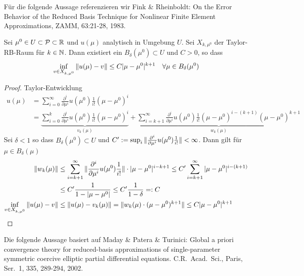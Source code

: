 Für die folgende Aussage referenzieren wir Fink \& Rheinboldt: On the Error Behavior of the Reduced Basis Technique for Nonlinear Finite Element Approximations, ZAMM, 63:21-28, 1983.

\begin{satz}
	Sei $\mu^0 \in U \subset \mathcal{P} \subset \mathbb{R}$ und $u(\mu)$ analytisch in Umgebung $U$. Sei $X_{k,\mu^0}$ der Taylor-RB-Raum für $k \in \mathbb{N}$. Dann existiert ein $B_\delta(\mu^0) \subset U$ und $C > 0$, so dass
	\[
		\inf_{v \in X_{k,\mu^0}} \|u(\mu)-v\| \leq C |\mu-\mu^0|^{k+1} \quad \forall \mu \in B_\delta(\mu^0)
	\]

	\begin{proof}
		Taylor-Entwicklung
		\begin{align*}
			u(\mu) &= \sum_{i=0}^\infty \frac{\partial^i}{\partial\mu^i} u(\mu^0) \frac{1}{i!} (\mu-\mu^0)^i\\
			&= \underbrace{\sum_{i=0}^k \frac{\partial^i}{\partial\mu^i} u(\mu^0) \frac{1}{i!} (\mu-\mu^0)^i}_{v_k(\mu)} + \underbrace{\sum_{i=k+1}^\infty \frac{\partial^i}{\partial\mu^i} u(\mu^0) \frac{1}{i!} (\mu-\mu^0)^{i-(k+1)} (\mu-\mu^0)^{k+1}}_{w_k(\mu)}
		\end{align*}
		Sei $\delta < 1$ so dass $B_\delta(\mu^0) \subset U$ und $C' := \sup_i \|\frac{\partial^i}{\partial\mu^i} u(\mu^0) \frac{1}{i!}\| < \infty$. Dann gilt für $\mu \in B_\delta(\mu)$
		\begin{align*}
			\|w_k(\mu)\| &\leq \sum_{i=k+1}^\infty \|\frac{\partial^i}{\partial\mu^i} u(\mu^0) \frac{1}{i!}\| \cdot |\mu-\mu^0|^{i-k+1} \leq C' \sum_{i=k+1}^\infty |\mu-\mu^0|^{i-(k+1)}\\
			&\leq C' \frac{1}{1-|\mu-\mu^0|} \leq C' \frac{1}{1-\delta} =: C\\
			\inf_{v \in X_{k,\mu^0}} \|u(\mu)-v\| &\leq \|u(\mu)-v_k(\mu)\| = \|w_k(\mu) \cdot (\mu-\mu^0)^{k+1}\| \leq C |\mu-\mu^0|^{k+1}
		\end{align*}
	\end{proof}
\end{satz}

Die folgende Aussage basiert auf Maday \& Patera \& Turinici: Global a priori convergence theory for reduced-basis approximations of single-parameter symmetric coercive elliptic partial differential equations. C.R.\ Acad.\ Sci., Paris, Ser.\ 1, 335, 289-294, 2002.

